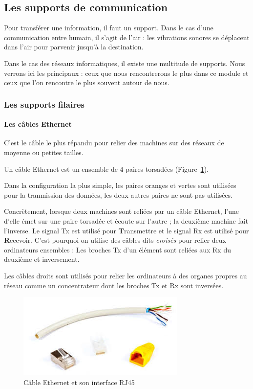 \subsection{Les supports de communication}
Pour transférer une information, il faut un support. Dans le cas d'une communication entre humain, il s'agit de l'air : les vibrations sonores se déplacent dans l'air pour parvenir jusqu'à la destination.

Dans le cas des réseaux informatiques, il existe une multitude de supports. Nous verrons ici les principaux : ceux que nous rencontrerons le plus dans ce module et ceux que l'on rencontre le plus souvent autour de nous.

\subsubsection{Les supports filaires}

\paragraph{Les câbles Ethernet}
C'est le câble le plus répandu pour relier des machines sur des réseaux de moyenne ou petites tailles.

Un câble Ethernet est un ensemble de 4 paires torsadées (Figure~\ref{fig:cableEthernet}).

Dans la configuration la plus simple, les paires oranges et vertes sont utilisées pour la tranmission des données, les deux autres paires ne sont pas utilisées.

Concrètement, lorsque deux machines sont reliées par un câble Ethernet, l'une d'elle émet sur une paire torsadée et écoute sur l'autre ; la deuxième machine fait l'inverse. Le signal Tx est utilisé pour \textbf{T}ransmettre et le signal Rx est utilisé pour \textbf{R}ecevoir. C'est pourquoi on utilise des câbles dits \textit{croisés} pour relier deux ordinateurs ensembles : Les broches Tx d'un élément sont reliées aux Rx du deuxième et inversement.

Les câbles droits sont utilisés pour relier les ordinateurs à des organes propres au réseau comme un concentrateur dont les broches Tx et Rx sont inversées.

\begin{figure}
\centering
  \includegraphics[width=.3\textwidth]{images/materiel/cableEthernet}
  \caption{Câble Ethernet et son interface RJ45}
  \label{fig:cableEthernet}
\end{figure}

